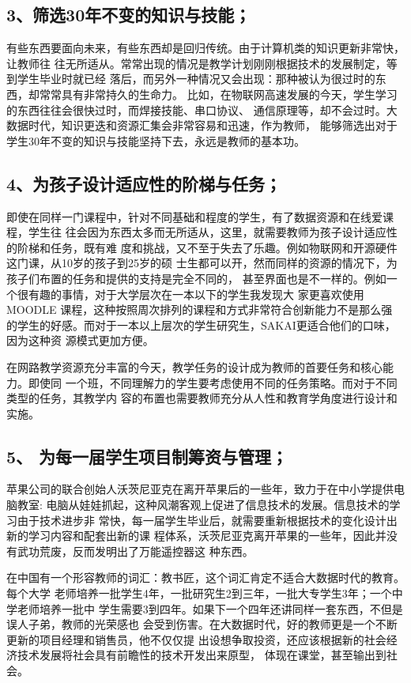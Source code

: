 \documentclass[11pt]{ctexart}
\begin{document}
{{{{\subsection{3、筛选30年不变的知识与技能；}
\label{sec:orgdc3d944}

有些东西要面向未来，有些东西却是回归传统。由于计算机类的知识更新非常快，让教师往
往无所适从。常常出现的情况是教学计划刚刚根据技术的发展制定，等到学生毕业时就已经
落后，而另外一种情况又会出现：那种被认为很过时的东西，却常常具有非常持久的生命力。
比如，在物联网高速发展的今天，学生学习的东西往往会很快过时，而焊接技能、串口协议、
通信原理等，却不会过时。大数据时代，知识更迭和资源汇集会非常容易和迅速，作为教师，
能够筛选出对于学生30年不变的知识与技能坚持下去，永远是教师的基本功。

\subsection{4、为孩子设计适应性的阶梯与任务；}
\label{sec:org95b4c4c}

即使在同样一门课程中，针对不同基础和程度的学生，有了数据资源和在线爱课程，学生往
往会因为东西太多而无所适从，这里，就需要教师为孩子设计适应性的阶梯和任务，既有难
度和挑战，又不至于失去了乐趣。例如物联网和开源硬件这门课，从10岁的孩子到25岁的硕
士生都可以开，然而同样的资源的情况下，为孩子们布置的任务和提供的支持是完全不同的，
甚至界面也是不一样的。例如一个很有趣的事情，对于大学层次在一本以下的学生我发现大
家更喜欢使用MOODLE 课程，这种按照周次排列的课程和方式非常符合创新能力不是那么强
的学生的好感。而对于一本以上层次的学生研究生，SAKAI更适合他们的口味，因为这种资
源模式更加方便。

在网路教学资源充分丰富的今天，教学任务的设计成为教师的首要任务和核心能力。即使同
一个班，不同理解力的学生要考虑使用不同的任务策略。而对于不同类型的任务，其教学内
容的布置也需要教师充分从人性和教育学角度进行设计和实施。

\subsection{5、 为每一届学生项目制筹资与管理；}
\label{sec:org5f6e1c0}

苹果公司的联合创始人沃茨尼亚克在离开苹果后的一些年，致力于在中小学提供电脑教室:
电脑从娃娃抓起，这种风潮客观上促进了信息技术的发展。信息技术的学习由于技术进步非
常快，每一届学生毕业后，就需要重新根据技术的变化设计出新的学习内容和配套出新的课
程体系，沃茨尼亚克离开苹果的一些年，因此并没有武功荒废，反而发明出了万能遥控器这
种东西。

在中国有一个形容教师的词汇：教书匠，这个词汇肯定不适合大数据时代的教育。每个大学
老师培养一批学生4年，一批研究生2到三年，一批大专学生3年；一个中学老师培养一批中
学生需要3到四年。如果下一个四年还讲同样一套东西，不但是误人子弟，教师的光荣感也
会受到伤害。在大数据时代，好的教师更是一个不断更新的项目经理和销售员，他不仅仅提
出设想争取投资，还应该根据新的社会经济技术发展将社会具有前瞻性的技术开发出来原型，
体现在课堂，甚至输出到社会。

}}}}
\end{document}
